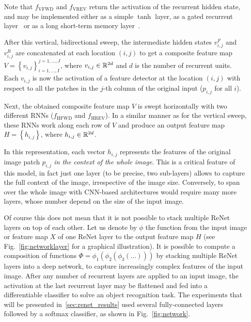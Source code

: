 Note that $f_{\text{VFWD}}$ and $f_{\text{VREV}}$ return the activation of the
recurrent hidden state, and may be implemented either as a simple $\tanh$ layer,
as a gated recurrent layer~\citep{Cho2014} or as a long short-term memory
layer~\citep{Hochreiter+Schmidhuber-1997}.

After this vertical, bidirectional sweep, the intermediate hidden states
$v^F_{i,j}$ and $v^R_{i,j}$ are concatenated at each location $(i,j)$ to get a
composite feature map $V= \left\{ v_{i,j} \right\}_{i=1,\ldots,I}^{
j=1,\ldots,J}$, where $v_{i,j} \in \mathbb{R}^{2d}$ and $d$ is the number of recurrent
units.  Each $v_{i,j}$ is now the activation of a feature detector at the
location $(i,j)$ with respect to all the patches in the $j$-th column of the
original input ($p_{i, j}$ for all $i$).

Next, the obtained composite feature map $V$ is swept horizontally with two
different RNNs ($f_{\text{HFWD}}$ and $f_{\text{HREV}}$). In a similar manner
as for the vertical sweep, these RNNs work along each row of $V$ and produce an
output feature map $H = \left\{ h_{i,j} \right\}$, where $h_{i,j} \in
\mathbb{R}^{2d}$.

In this representation, each vector $h_{i,j}$ represents the features of the
original image patch $p_{i,j}$ \emph{in the context of the whole image}. This
is a critical feature of this model, in fact just one layer (to be precise, two
sub-layers) allows to capture the full context of the image, irrespective of
the image size. Conversely, to span over the whole image with CNN-based
architectures would require many more layers, whose number depend on the size
of the input image.

Of course this does not mean that it is not possible to stack multiple ReNet
layers on top of each other. Let us denote by $\phi$ the function from the
input image or feature map $X$ of one ReNet layer to the output feature map $H$
(see Fig.~\ref{fig:networklayer} for a graphical illustration). It is possible
to compute a composition of functions $\Phi = \phi_1(\phi_2(\phi_3(\dots)))$ by
stacking multiple ReNet layers into a deep network, to capture increasingly
complex features of the input image. After any number of recurrent layers are
applied to an input image, the activation at the last recurrent layer may be
flattened and fed into a differentiable classifier to solve an object
recognition task. The experiments that will be presented
in~\autoref{sec:renet_results} used several fully-connected layers
followed by a softmax classifier, as shown in Fig.~\ref{fig:network}.

